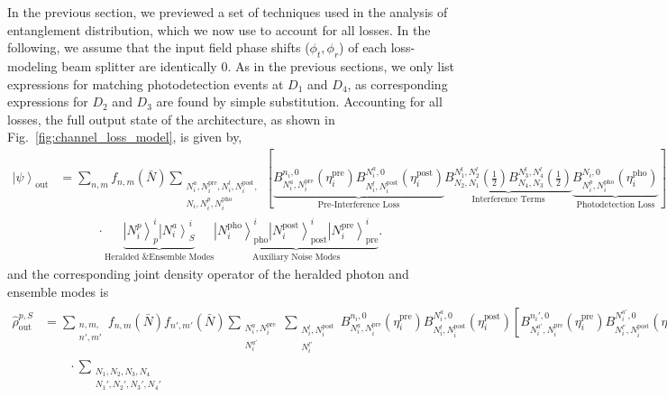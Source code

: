 \documentclass[aps,twocolumn,secnumarabic,amsmath,amssymb,pra,groupedaddress,
showpacs, showkeys,draft]{revtex4-1}
\newcommand{\ket}[1]{\left|#1\right\rangle}
\newcommand{\pna}[1]{\left(#1\right)}
\newcommand{\pnb}[1]{\left[#1\right]}
\begin{document}
\begin{widetext}
In the previous section, we previewed a set of techniques used in the analysis
of entanglement distribution, which we now use to account for all losses. In
the following, we assume that the input field phase shifts ($\phi_t,\phi_r$) of
each loss-modeling beam splitter are identically 0. As in the previous
sections, we only list expressions for matching photodetection events at $D_1$
and $D_4$, as corresponding expressions for $D_2$ and $D_3$ are found by simple
substitution. Accounting for all losses, the full output state of the
architecture, as shown in Fig.~\ref{fig:channel_loss_model}, is given by,
\begin{align}
\ket{\psi}_{\textrm{out}} & = \sum_{n,m} f_{n,m}\pna{\bar{N}}
\sum_{\substack{N_i^a,N_i^{\textrm{pre}},N_i^l,N_i^{\textrm{post}},\\ N_i,N_i^p,N_i^{\textrm{pho}} }}
\pnb{\underbrace{B_{N_i^a,N_i^{\textrm{pre}}}^{n_i,0}\pna{\eta_i^{\textrm{pre}}}  
B_{N_i^l,N_i^{\textrm{post}}}^{N_i^a,0}\pna{\eta_i^{\textrm{post}}}}_\text{Pre-Interference Loss}
\underbrace{B_{N_2,N_1}^{N_1^l,N_2^l}\pna{\frac{1}{2}} B_{N_4,N_3}^{N_3^l,N_4^l}\pna{\frac{1}{2}}}_\text{Interference Terms}
\underbrace{B_{N_i^p,N_i^{\textrm{pho}}}^{N_i,0}\pna{\eta_i^{\textrm{pho}}}}_\text{Photodetection Loss}}   \nonumber \\
& \qquad \quad \cdot \underbrace{\ket{N_i^p}_{p}^i \ket{N_i^a}_{S}^i}_\text{Heralded \& Ensemble Modes} \underbrace{\ket{N_i^{\textrm{pho}}}_{\textrm{pho}}^i \ket{N_i^{\textrm{post}}}_{\textrm{post}}^i \ket{N_i^{\textrm{pre}}}_{\textrm{pre}}^i}_\text{Auxiliary Noise Modes}. 
\end{align}
and the corresponding joint density operator of the heralded photon and
ensemble modes is 
\begin{align}
	\hat{\rho}_{\textrm{out}}^{p,S} & = \sum_{\substack{n,m,\\n',m'}} f_{n,m}\pna{\bar{N}} f_{n',m'}\pna{\bar{N}} \sum_{\substack{N_i^a,N_i^{\textrm{pre}}\\ N_i^{a\prime} }} \sum_{\substack{N_i^l,N_i^{\textrm{post}}\\ N_i^{l\prime} }}
	B_{N_i^a,N_i^{\textrm{pre}}}^{n_i,0}\pna{\eta_i^{\textrm{pre}}} B_{N_i^l,N_i^{\textrm{post}}}^{N_i^a,0}\pna{\eta_i^{\textrm{post}}} \pnb{B_{N_i^{a\prime},N_i^{\textrm{pre}}}^{n_i',0}\pna{\eta_i^{\textrm{pre}}} B_{N_i^{l\prime},N_i^{\textrm{post}}}^{N_i^{a\prime},0}\pna{\eta_i^{\textrm{post}}}}^{*} \nonumber \\
	& \qquad \cdot \sum_{\substack{N_1,N_2,N_3,N_4\\ N_1',N_2',N_3',N_4'}}

\end{align}
\end{widetext}
\end{document}
